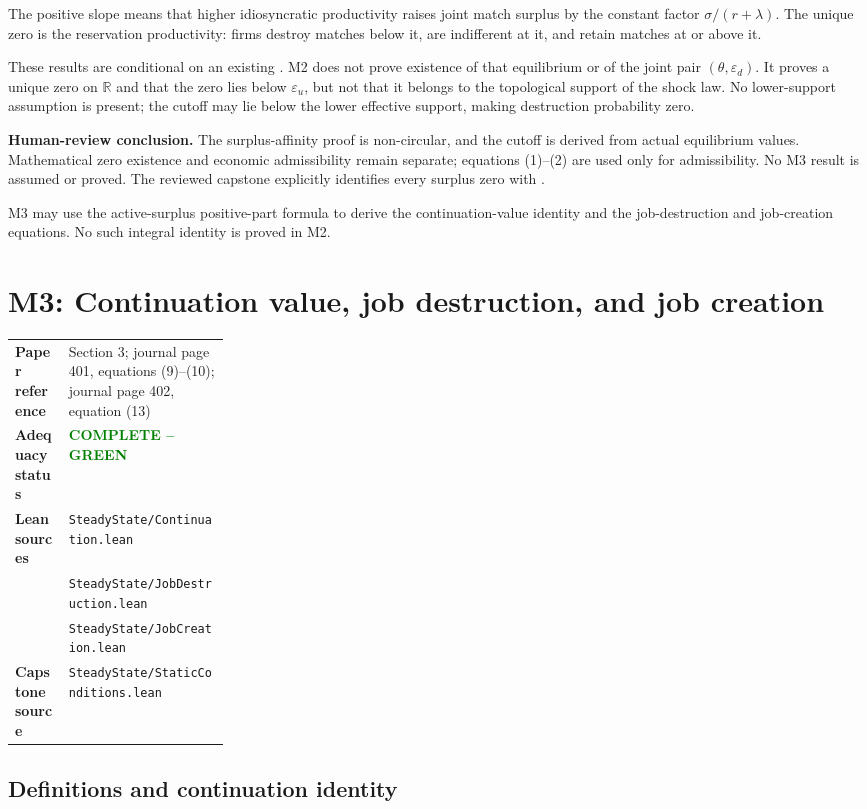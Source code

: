 \documentclass[11pt]{article}
\newcommand{\code}[1]{\texttt{\detokenize{#1}}}
\begin{document}
The positive slope means that higher idiosyncratic productivity raises joint
match surplus by the constant factor \(\sigma/(r+\lambda)\). The unique zero
is the reservation productivity: firms destroy matches below it, are
indifferent at it, and retain matches at or above it.

These results are conditional on an existing \code{ValueEquilibrium}. M2 does
not prove existence of that equilibrium or of the joint pair
\((\theta,\varepsilon_d)\). It proves a unique zero on \(\mathbb R\) and that
the zero lies below \(\varepsilon_u\), but not that it belongs to the
topological support of the shock law. No lower-support assumption is present;
the cutoff may lie below the lower effective support, making destruction
probability zero.

\textbf{Human-review conclusion.} The surplus-affinity proof is non-circular,
and the cutoff is derived from actual equilibrium values. Mathematical
zero existence and economic admissibility remain separate; equations
(1)--(2) are used only for admissibility. No M3 result is assumed or proved.
The reviewed capstone explicitly identifies every surplus zero with
\code{reservationCutoff}.

M3 may use the active-surplus positive-part formula to derive the
continuation-value identity and the job-destruction and job-creation
equations. No such integral identity is proved in M2.

\section{M3: Continuation value, job destruction, and job creation}

\begin{tabularx}{\linewidth}{@{}>{\bfseries}p{0.25\linewidth}X@{}}
Paper reference & Section 3; journal page 401, equations (9)--(10);
journal page 402, equation (13)\\
Adequacy status & \textcolor{green}{\textbf{COMPLETE -- GREEN}}\\
Lean sources & \nolinkurl{SteadyState/Continuation.lean}\\
& \nolinkurl{SteadyState/JobDestruction.lean}\\
& \nolinkurl{SteadyState/JobCreation.lean}\\
Capstone source & \nolinkurl{SteadyState/StaticConditions.lean}\\
\end{tabularx}

\subsection{Definitions and continuation identity}
\end{document}
